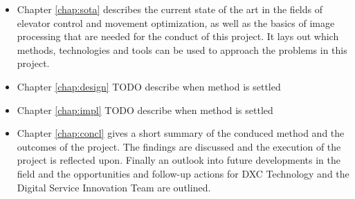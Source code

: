 \begin{itemize}
    \item Chapter \ref{chap:sota} describes the current state of the art in the fields of elevator control and movement optimization, as well as the basics of image processing that are needed for the conduct of this project. It lays out which methods, technologies and tools can be used to approach the problems in this project.
    \item Chapter \ref{chap:design} TODO describe when method is settled
    \item Chapter \ref{chap:impl} TODO describe when method is settled
    \item Chapter \ref{chap:concl} gives a short summary of the conduced method and the outcomes of the project. The findings are discussed and the execution of the project is reflected upon. Finally an outlook into future developments in the field and the opportunities and follow-up actions for DXC Technology and the Digital Service Innovation Team are outlined.
\end{itemize}